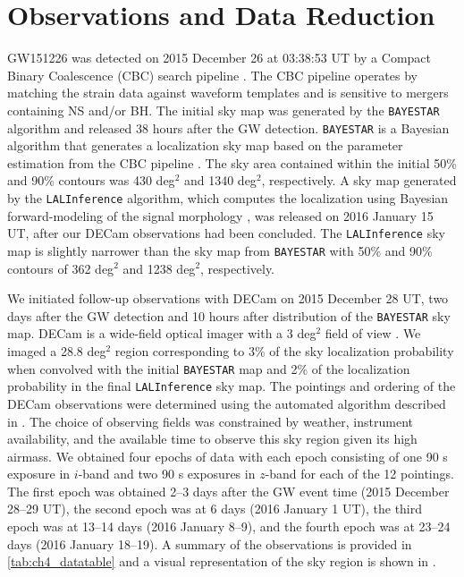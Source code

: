 \clearpage
\section{Observations and Data Reduction}
\label{sec:ch4_obs}
GW151226 was detected on 2015 December 26 at 03:38:53 UT by a  Compact Binary Coalescence (CBC) search pipeline \citep{LIGOGW151226}. The CBC pipeline operates by matching the strain data against waveform templates and is sensitive to mergers containing NS and/or BH.  The initial sky map was generated by the {\tt BAYESTAR} algorithm and released 38 hours after the GW detection. {\tt BAYESTAR} is a Bayesian  algorithm that generates a localization sky map based on the parameter estimation from the CBC pipeline \citep{Singer+14,SingerPrice16}. The sky area contained within the initial 50\% and 90\% contours was 430 deg$^2$ and 1340 deg$^2$, respectively. A sky map generated by the {\tt LALInference} algorithm, which computes the localization using Bayesian forward-modeling  of the signal morphology \citep{Veitch+15}, was released on 2016 January 15 UT,  after our DECam observations had been concluded. The {\tt LALInference} sky map is slightly narrower than the sky map from {\tt BAYESTAR} with 50\% and 90\% contours  of 362 deg$^2$ and 1238 deg$^2$, respectively.

We initiated follow-up observations with DECam on 2015 December 28 UT, two days after the GW detection and 10 hours after distribution of the {\tt BAYESTAR} sky map. DECam is a wide-field optical imager with a 3 deg$^2$ field of view  \citep{Flaugher+15}. We imaged a 28.8 deg$^2$ region corresponding to 3\% of the sky localization probability when convolved with the initial {\tt BAYESTAR} map  and 2\% of the localization probability in the final {\tt LALInference} sky map.  The pointings and ordering of the DECam observations were determined using the automated algorithm described in \citet{GW150914DECam}. The choice  of observing fields was constrained by weather, instrument availability, and the available time to observe this sky region given its high airmass. We obtained four epochs of data with each epoch consisting of one 90 s exposure in $i$-band and two 90 s exposures in $z$-band for each of the 12 pointings. The first epoch was obtained 2--3 days after the GW event time (2015 December 28--29 UT), the second epoch was at 6 days (2016 January 1 UT), the third epoch was at 13--14 days (2016 January 8--9), and the fourth epoch was at 23--24 days (2016 January 18--19). A summary of the observations is provided in \cref{tab:ch4_datatable} and a visual representation of the sky region is shown in .

